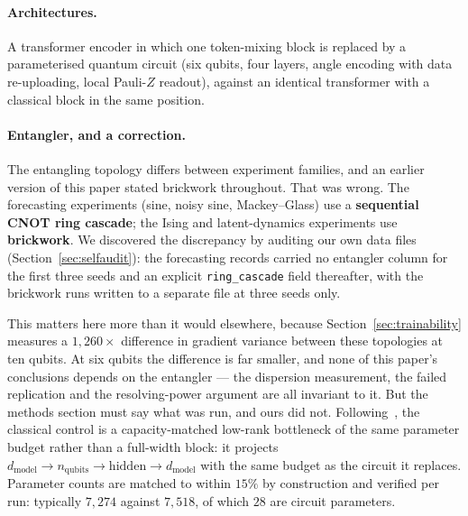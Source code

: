 \documentclass[11pt,onecolumn]{article}
\newif\ifdraft
\newcommand{\closed}[1]{%
  \ifdraft\par\vspace{2pt}\noindent
  \fcolorbox{DoneFG}{DoneBG}{\begin{minipage}{0.97\linewidth}\small
    \textcolor{DoneFG}{\textbf{AUDIT CLOSED.} #1}\end{minipage}}\par\vspace{4pt}\fi}
\begin{document}
\paragraph{Architectures.}
A transformer encoder in which one token-mixing block is replaced by a
parameterised quantum circuit (six qubits, four layers, angle encoding
with data re-uploading, local Pauli-$Z$ readout), against an identical
transformer with a classical block in the same position.

\paragraph{Entangler, and a correction.}
The entangling topology differs between experiment families, and an
earlier version of this paper stated brickwork throughout. That was
wrong. The forecasting experiments (sine, noisy sine, Mackey--Glass) use
a \textbf{sequential CNOT ring cascade}; the Ising and latent-dynamics
experiments use \textbf{brickwork}. We discovered the discrepancy by
auditing our own data files (Section~\ref{sec:selfaudit}): the
forecasting records carried no entangler column for the first three
seeds and an explicit \texttt{ring\_cascade} field thereafter, with the
brickwork runs written to a separate file at three seeds only.

This matters here more than it would elsewhere, because
Section~\ref{sec:trainability} measures a $1{,}260\times$ difference in
gradient variance between these topologies at ten qubits. At six qubits
the difference is far smaller, and none of this paper's conclusions
depends on the entangler --- the dispersion measurement, the failed
replication and the resolving-power argument are all invariant to it.
But the methods section must say what was run, and ours did not. Following~\cite{qasa}, the classical control is a
capacity-matched low-rank bottleneck of the same parameter budget rather
than a full-width block: it projects $d_{\mathrm{model}} \rightarrow
n_{\mathrm{qubits}} \rightarrow \mathrm{hidden} \rightarrow
d_{\mathrm{model}}$ with the same budget as the circuit it replaces.
Parameter counts are matched to within $15\%$ by construction and
verified per run: typically $7{,}274$ against $7{,}518$, of which $28$
are circuit parameters.

\closed{v3 flagged for verification whether the dynamics-model control
(\texttt{DynamicsCore}, \texttt{quantum=False}) is likewise a bottleneck
rather than a full-width block. It is. The classical token layer is
\texttt{Linear}$(d_{\mathrm{model}} \rightarrow n_{\mathrm{qubits}})$,
$\tanh$, \texttt{Linear}$(n_{\mathrm{qubits}} \rightarrow 16)$, $\tanh$,
\texttt{Linear}$(16 \rightarrow d_{\mathrm{model}})$, with
$n_{\mathrm{qubits}} = 6$. Both arms therefore constrict to six
dimensions in the same sublayer, so the Ising and CartPole comparisons
are capacity-matched in the sense of~\cite{qasa}. No qualification is
required.}
\end{document}
